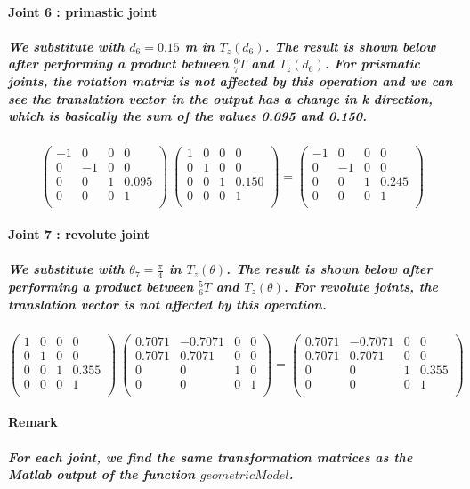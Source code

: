 \paragraph{Joint 6 : primastic joint}
\subparagraph{We substitute with $d_6 = 0.15$ m in $T_z(d_6)$. The result is shown below after performing a product between $^{6}_7T$ and $T_z(d_6)$. For prismatic joints, the rotation matrix is not affected by this operation and we can see the translation vector in the output has a change in k direction, which is basically the sum of the values 0.095 and 0.150.}

\[
\begin{pmatrix}
-1 & 0 & 0 & 0 \\
0 & -1 & 0 & 0 \\
0 & 0 & 1 & 0.095 \\
0 & 0 & 0 & 1 \\
\end{pmatrix}
\
\begin{pmatrix}
1 & 0 & 0 & 0 \\
0 & 1 & 0 & 0 \\
0 & 0 & 1 & 0.150 \\
0 & 0 & 0 & 1 \\
\end{pmatrix}
=
\begin{pmatrix}
-1 & 0 & 0 & 0 \\
0 & -1 & 0 & 0 \\
0 & 0 & 1 & 0.245 \\
0 & 0 & 0 & 1 \\
\end{pmatrix}
\]

\paragraph{Joint 7 : revolute joint}
\subparagraph{We substitute with $\theta_7 = \frac{\pi}{4}$ in $T_z(\theta)$. The result is shown below after performing a product between $^{5}_6T$ and $T_z(\theta)$. For revolute joints, the translation vector is not affected by this operation.}
\[
\begin{pmatrix}
1 & 0 & 0 & 0 \\
0 & 1 & 0 & 0 \\
0 & 0 & 1 & 0.355 \\
0 & 0 & 0 & 1 \\
\end{pmatrix}
\
\begin{pmatrix}
0.7071 & -0.7071 & 0 & 0 \\
0.7071 & 0.7071 & 0 & 0 \\
0 & 0 & 1 & 0 \\
0 & 0 & 0 & 1 \\
\end{pmatrix}
=
\begin{pmatrix}
0.7071 & -0.7071 & 0 & 0 \\
0.7071 & 0.7071 & 0 & 0 \\
0 & 0 & 1 & 0.355 \\
0 & 0 & 0 & 1 \\
\end{pmatrix}
\]

\paragraph{Remark}
\subparagraph{For each joint, we find the same transformation matrices as the Matlab output of the function $geometricModel$.}

\newpage

